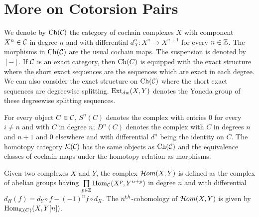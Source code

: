 \section{More on Cotorsion Pairs}\label{sec:more_cot}

We denote by $\mathrm{Ch}(\mathcal{C})$ the category of cochain complexes $X$ with component $X^n\in \mathcal{C}$ in degree $n$ and with differential $d^n_X\colon X^n\to X^{n+1}$ for every $n\in \mathbb{Z}$. The morphisms in $\mathrm{Ch}(\mathcal{C})$ are the usual cochain maps. The suspension is denoted by $[-]$.
 If $\mathcal{C}$ is an exact category, then $\mathrm{Ch}(C)$ is equipped with the exact structure where the short exact sequences are the sequences which are exact in each degree. We can also consider the exact structure on $\mathrm{Ch}(\mathcal{C})$ where the short exact sequences are degreewise splitting. $\operatorname{Ext}_{dw}(X, Y)$ denotes the Yoneda group of these degreewise splitting sequences.

 For every object $C\in \mathcal{C}$, $S^n(C)$ denotes the complex with entries $0$ for every $i\neq n$ and with $C$ in degree $n$; $D^n(C)$ denotes the complex with $C$ in degrees $n$ and $n+1$ and $0$ elsewhere and with differential $d^n$ being the identity on $C$. The homotopy category $\mathcal{K}(\mathcal{C})$ has the same objects as $\mathrm{Ch}(\mathcal{C})$ and the equivalence classes of cochain maps under the homotopy relation as morphisms.

Given two complexes $X$ and $Y$, the complex $\mathcal{H}\mathnormal{om}(X, Y)$ is defined as the complex of abelian groups having $\prod\limits_{p\in \mathbb{Z}}\operatorname{Hom}_{\mathcal{C}}(X^p, Y^{n+p})$ in degree $n$  and with differential $d_H(f)=d_Y\circ f -(-1)^nf\circ d_X$. The $n^{\text th}$-cohomology of  $\mathcal{H}\mathnormal{om}(X, Y)$ is given by $\operatorname{Hom}_{\mathcal{K}(C)} (X, Y[n])$.


